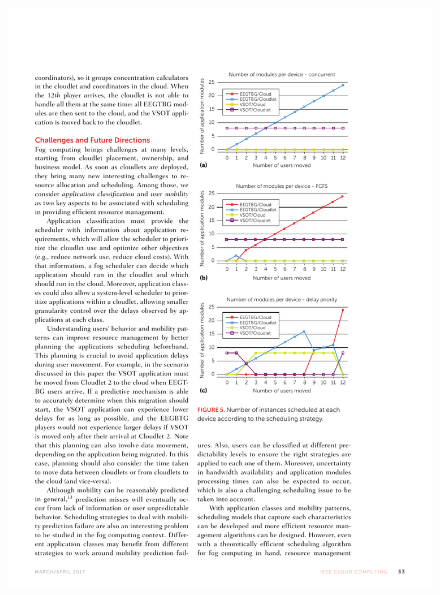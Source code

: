 \documentclass[10pt, pdf, xcolor=pdftex, dvipsnames, table]{beamer}
\begin{document}
\begin{frame}
 	\begin{figure}[htbp]
 		\centerline{\includegraphics[scale=1.2]{images/5b.pdf}}
 		\caption[]{}
 	\end{figure}
\end{frame}
\end{document}
